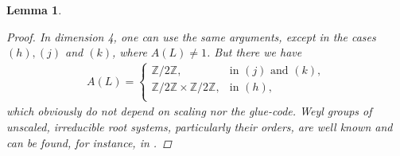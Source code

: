 \documentclass{amsart}
\newtheorem{lem}[thm]{Lemma}
\theoremstyle{definition}
\theoremstyle{remark}
\def\ZZ{\mathbb{Z}}
\begin{document}
\begin{lem}
\begin{proof}
  In dimension 4, one can use the same arguments, except in the cases $(h),(j)$ and $(k)$, where $A(L) \neq 1$. But there we have
  \begin{align*}
  A(L) = 
  \begin{cases}
   \ZZ/2\ZZ, & \text{in $(j)$ and $(k)$}, \\
   \ZZ/2\ZZ \times \ZZ/2\ZZ, & \text{in $(h),$} \\
  \end{cases}
  \end{align*}
  which obviously do not depend on scaling nor the glue-code.
  Weyl groups of unscaled, irreducible root systems, particularly their orders, are well known and can be found, for instance, in \cite{bou08}.
 \end{proof}
\end{lem}
\end{document}
